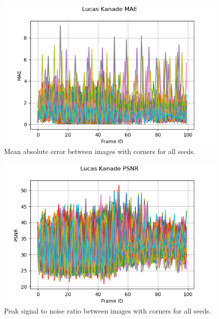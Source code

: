 \documentclass[11pt, conference, letterpaper]{IEEEtran}
\begin{document}
\begin{figure}[h!]
    \centering
    \includegraphics[width=\linewidth]{mc_images/mc_lk_mae.png}
    \caption{Mean absolute error between images with corners for all seeds.}
    \label{fig:mc_lk_mae}
\end{figure}

\begin{figure}[h!]
    \centering
    \includegraphics[width=\linewidth]{mc_images/mc_lk_psnr.png}
    \caption{Peak signal to noise ratio between images with corners for all seeds.}
    \label{fig:mc_lk_psnr}
\end{figure}
\end{document}
